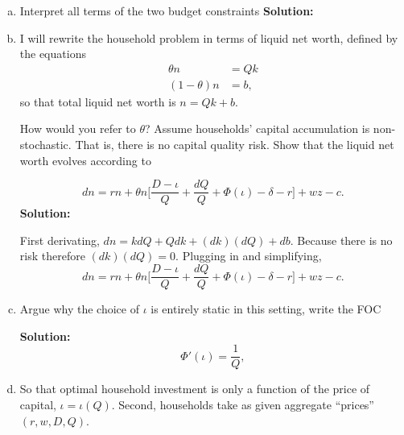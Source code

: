 \documentclass[11pt]{extarticle}
\theoremstyle{plain}
\theoremstyle{definition}
\begin{document}
\begin{enumerate}[(a)]
 \item Interpret all terms of the two budget constraints
\textbf{Solution:} 

\item I will rewrite the household problem in terms of liquid net worth, defined by the equations 
\begin{align*}
	\theta n &= Q k \\
	(1-\theta) n &= b,
\end{align*}
so that total liquid net worth is $n = Qk + b$.

 How would you refer to $\theta$? Assume households' capital accumulation is non-stochastic. That is, there is no capital quality risk. Show that the liquid net worth evolves according to 

\begin{equation*}
	dn = rn +  \theta n \bigg[ \frac{D - \iota }{Q} +  \frac{dQ}{Q} + \Phi(\iota) - \delta - r \bigg]  + w z - c .
\end{equation*}
\textbf{Solution:} 

 First derivating, $dn = k dQ + Q dk + (dk)(dQ) + db$. Because there is no risk therefore $(dk)(dQ) = 0$. Plugging in and simplifying, 
\begin{equation*}
	dn = rn +  \theta n \bigg[ \frac{D - \iota }{Q} +  \frac{dQ}{Q} + \Phi(\iota) - \delta - r \bigg]  + w z - c .
\end{equation*}

\item Argue why the choice of $\iota$ is entirely static in this setting, write the FOC

\textbf{Solution:}
\begin{equation*}
	\Phi'(\iota) = \frac{1}{Q},
\end{equation*}

\item So that optimal household investment is only a function of the price of capital, $\iota = \iota(Q)$. Second, households take as given aggregate ``prices'' $(r, w, D, Q)$. 



\end{enumerate}
\end{document}
